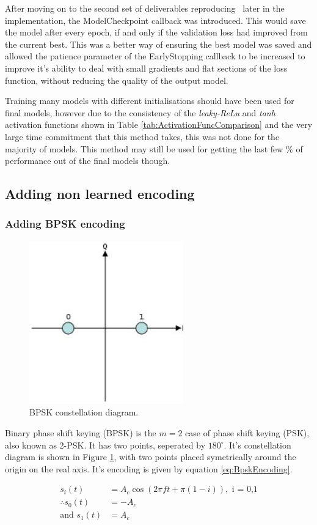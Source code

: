 \documentclass[12pt,onecolumn,letterpaper]{article}
\newcommand{\code}{\textit}
\begin{document}
After moving on to the second set of deliverables reproducing~\cite{Aoudia} later in the implementation,  the ModelCheckpoint callback was introduced. This would save the model after every epoch, if and only if the validation loss had improved from the current best. This was a better way of ensuring the best model was saved and allowed the patience parameter of the EarlyStopping callback to be increased to improve it's ability to deal with small gradients and flat sections of the loss function, without reducing the quality of the output model.

Training many models with different initialisations should have been used for final models, however due to the consistency of the \code{leaky-ReLu} and \code{tanh} activation functions shown in Table \ref{tab:ActivationFuncComparison} and the very large time commitment that this method takes, this was not done for the majority of models. This method may still be used for getting the last few $\%$ of performance out of the final models though.

\subsection{Adding non learned encoding}

\subsubsection{Adding BPSK encoding}
\label{sec:AddingBpsk}

\begin{figure}[t]
   \centering
   \includegraphics[width=0.2\linewidth]{figures/bpsk_const_diag.jpg}
   \caption{BPSK constellation diagram.}
   \label{fig:BspkConstDiag}
\end{figure}

Binary phase shift keying (BPSK) is the $m = 2$ case of phase shift keying (PSK), also known as 2-PSK. It has two points, seperated by $180^\circ$. It's constellation diagram is shown in Figure \ref{fig:BspkConstDiag}, with two points placed symetrically around the origin on the real axis. It's encoding is given by equation \ref{eq:BpskEncoding}.

\begin{subequations}
\begin{align}
   s_i(t) &= A_c \cos(2\pi ft + \pi(1-i)), \mbox{ i = 0,1} \label{eq:BpskEncoding} \\
   \therefore s_0(t) &= -A_c \\
   \mbox{and } s_1(t) &= A_c
\end{align}
\end{subequations}
\end{document}
